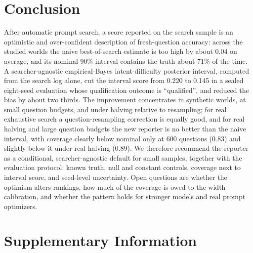 \documentclass{article}
\begin{document}
\section{Conclusion}
After automatic prompt search, a score reported on the search sample is an optimistic and over-confident description of fresh-question accuracy: across the studied worlds the naive best-of-search estimate is too high by about 0.04 on average, and its nominal 90\% interval contains the truth about 71\% of the time. A searcher-agnostic empirical-Bayes latent-difficulty posterior interval, computed from the search log alone, cut the interval score from 0.220 to 0.145 in a sealed eight-seed evaluation whose qualification outcome is ``qualified'', and reduced the bias by about two thirds. The improvement concentrates in synthetic worlds, at small question budgets, and under halving relative to resampling; for real exhaustive search a question-resampling correction is equally good, and for real halving and large question budgets the new reporter is no better than the naive interval, with coverage clearly below nominal only at 600 questions (0.83) and slightly below it under real halving (0.89). We therefore recommend the reporter as a conditional, searcher-agnostic default for small samples, together with the evaluation protocol: known truth, null and constant controls, coverage next to interval score, and seed-level uncertainty. Open questions are whether the optimism alters rankings, how much of the coverage is owed to the width calibration, and whether the pattern holds for stronger models and real prompt optimizers.

\clearpage



\clearpage
\appendix
\section{Supplementary Information}
\end{document}
